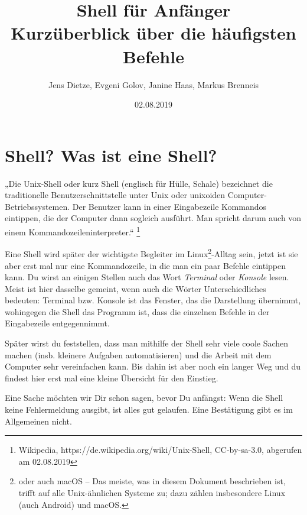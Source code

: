 \documentclass[a4paper,12pt]{article}
\title{Shell für Anfänger\\
\large{Kurzüberblick über die häufigsten Befehle}}
\author{Jens Dietze, Evgeni Golov, Janine Haas, Markus Brenneis}
\date{02.08.2019}
\begin{document}
\maketitle

\tableofcontents
\pagebreak
\parindent 0pt
\parskip 10pt
\section{Shell? Was ist eine Shell?}
„Die Unix-Shell oder kurz Shell (englisch für Hülle, Schale) bezeichnet die traditionelle Benutzerschnittstelle unter Unix oder unixoiden Computer-Betriebssystemen. Der Benutzer kann in einer Eingabezeile Kommandos eintippen, die der Computer dann sogleich ausführt. Man spricht darum auch von einem Kommandozeileninterpreter.“
\footnote{Wikipedia, https://de.wikipedia.org/wiki/Unix-Shell, CC-by-sa-3.0, abgerufen am 02.08.2019}

Eine Shell wird später der wichtigste Begleiter im Linux\footnote{oder auch macOS -- Das meiste, was in diesem Dokument beschrieben ist, trifft auf alle Unix-ähnlichen Systeme zu; dazu zählen insbesondere Linux (auch Android) und macOS.}-Alltag sein, 
jetzt ist sie aber erst mal nur eine Kommandozeile, in die man ein paar 
Befehle eintippen kann. Du wirst an einigen Stellen auch das Wort 
\emph{Terminal} oder \emph{Konsole} lesen. Meist ist hier dasselbe gemeint, wenn 
auch die Wörter Unterschiedliches bedeuten: Terminal bzw. Konsole ist 
das Fenster, das die Darstellung übernimmt, wohingegen die Shell das Programm ist, dass die einzelnen Befehle in der Eingabezeile entgegennimmt.

Später wirst du feststellen, dass man mithilfe der Shell sehr viele 
coole Sachen machen (insb. kleinere Aufgaben automatisieren) und die 
Arbeit mit dem Computer sehr vereinfachen kann. Bis dahin ist aber noch 
ein langer Weg und du findest hier erst mal eine kleine Übersicht für 
den Einstieg.

Eine Sache möchten wir Dir schon sagen, bevor Du anfängst: Wenn die Shell keine Fehlermeldung ausgibt, ist alles gut gelaufen. Eine Bestätigung gibt es im Allgemeinen nicht.
\end{document}
